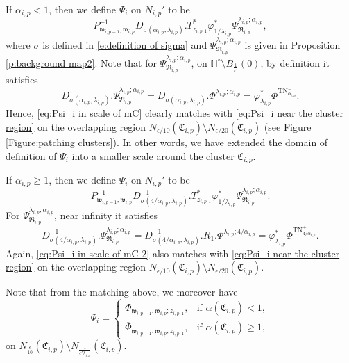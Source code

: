 \documentclass[a4paper,11pt]{amsart}
\theoremstyle{definition}
\numberwithin{equation}{section}
\newcommand{\mw} {\mathfrak w}
\newcommand{\mR} {\mathfrak R}
\newcommand{\mC} {\mathfrak C}
\DeclareMathOperator{\TN}{TN}
\begin{document}
If $\alpha_{i,p}<1$, then we define $\Psi_i$ on $N_{i, p}'$ to be
\begin{equation}\label{eq:Psi_i in scale of mC}
    P_{\mw_{i,p-1},\mw_{i,p}}^{-1}D_{\sigma(\alpha_{i, p}, \lambda_{i, p})}. T_{{z}_{i, p,1}}^*\varphi_{1/\lambda_{i, p}}^*\Psi_{\mR_{i, p}}^{\lambda_{i, p}; \alpha_{i, p}},
\end{equation} 
where $\sigma$ is defined in \eqref{e:definition of sigma} and  $\Psi_{\mR_{i, p}}^{\lambda_{i, p}; \alpha_{i, p}}$ is given in  Proposition \ref{p:background map2}.  Note that for $\Psi_{\mR_{i, p}}^{\lambda_{i, p}; \alpha_{i, p}}$, on $\mathbb{H}^\circ\setminus B_{\frac{1}{\epsilon'}}(0)$, by  definition  it satisfies 
$$D_{\sigma(\alpha_{i, p}, \lambda_{i, p})}.\Psi_{\mR_{i, p}}^{\lambda_{i, p}; \alpha_{i, p}}= D_{\sigma(\alpha_{i, p}, \lambda_{i, p})}.\Phi^{\lambda_{i, p}; \alpha_{i, p}}=\varphi_{\lambda_{i, p}}^*\Phi^{\TN^-_{\alpha_{i, p}}}.$$ Hence, \eqref{eq:Psi_i in scale of mC} clearly matches with \eqref{eq:Psi_i near the cluster region} on the overlapping region $N_{\epsilon/10}(\mC_{i,p})\setminus N_{\epsilon/20}(\mC_{i, p})$ (see Figure \ref{Figure:patching clusters}). In other words, we have extended the domain of definition of $\Psi_i$ into a smaller scale around the cluster $\mC_{i, p}$.






If $\alpha_{i,p}\geq1$, then we define $\Psi_i$ on $N_{i, p}'$ to be 
\begin{equation}\label{eq:Psi_i in scale of mC 2}
    P_{\mw_{i,p-1},\mw_{i,p}}^{-1}D_{\sigma(4/\alpha_{i, p}, \lambda_{i, p})}^{-1}. T_{{z}_{i, p,1}}^*\varphi_{1/\lambda_{i, p}}^*\Psi_{\mR_{i, p}}^{\lambda_{i, p}; \alpha_{i, p}}.
\end{equation}
For $\Psi^{\lambda_{i,p};\alpha_{i,p}}_{\mR_{i,p}}$, near infinity it satisfies
$$D_{\sigma(4/\alpha_{i, p}, \lambda_{i, p})}^{-1}.\Psi_{\mR_{i, p}}^{\lambda_{i, p}; \alpha_{i, p}}= D_{\sigma(4/\alpha_{i, p}, \lambda_{i, p})}^{-1}.R_1.\Phi^{\lambda_{i, p}; 4/\alpha_{i, p}}=\varphi_{\lambda_{i, p}}^*\Phi^{\TN^+_{4/\alpha_{i, p}}}.$$
Again, \eqref{eq:Psi_i in scale of mC 2} also matches with \eqref{eq:Psi_i near the cluster region} on the overlapping region $N_{\epsilon/10}(\mC_{i,p})\setminus N_{\epsilon/20}(\mC_{i, p})$.



Note that from the matching above, we moreover have 
\begin{equation}\label{eq:Psii formula}
    \Psi_i=\begin{cases}
		    \Phi_{\mw_{i,p-1}, \mw_{i,p}; z_{i,p,1}},&\text{if }\alpha(\mC_{i,p})<1,\\
            \overline{\Phi}_{\mw_{i,p-1}, \mw_{i,p}; z_{i,p,1}},&\text{if }\alpha(\mC_{i,p})\geq1,
		\end{cases}
\end{equation} 
on $N_{\frac{\epsilon}{10}}(\mC_{i,p})\setminus N_{\frac{1}{\epsilon'\lambda_{i,p}}}(\mC_{i,p})$.
\end{document}
